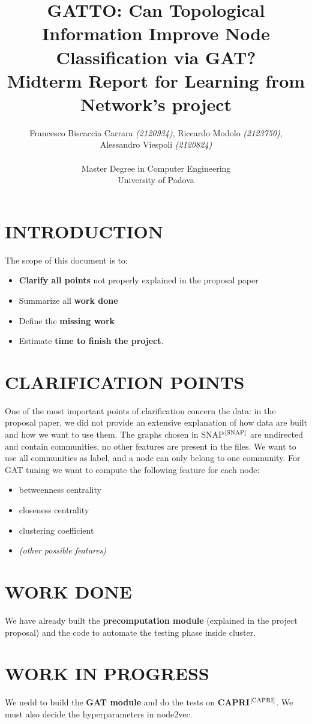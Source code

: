 \documentclass[12pt,conference]{ieeeconf} %
\title{GATTO: Can Topological Information Improve Node Classification via GAT?\\
\large Midterm Report for Learning from Network's project \\}
\author{Francesco Biscaccia Carrara \textit{(2120934)}, Riccardo Modolo \textit{(2123750)},\\ Alessandro Viespoli \textit{(2120824)} %
\\\\ Master Degree in Computer Engineering \\
University of Padova \\
}
\begin{document}
\maketitle
\thispagestyle{plain}
\pagestyle{plain}

\section{INTRODUCTION} 
The scope of this document is to:
\begin{itemize}
    \item \textbf{Clarify all points} not properly explained in the proposal paper
    \item Summarize all \textbf{work done}
    \item Define the \textbf{missing work} 
    \item Estimate \textbf{time to finish the project}.
\end{itemize}

\section{CLARIFICATION POINTS}
One of the most important points of clarification concern the data: in the proposal paper, we did not provide an extensive explanation of how data are built and how we want to use them.
The graphs chosen in SNAP$^\text{\cite{SNAP}}$ are undirected and contain communities, no other features are present in the files. 
We want to use all communities as label, and a node can only belong to one community.
For GAT tuning we want to compute the following feature for each node:
\begin{itemize}
    \item betweenness centrality
    \item closeness centrality
    \item clustering coefficient
    \item \textit{(other possible features)}
\end{itemize}


\section{WORK DONE}
We have already built the \textbf{precomputation module} (explained in the project proposal) 
and the code to automate the testing phase inside cluster.

\section{WORK IN PROGRESS}
We nedd to build the \textbf{GAT module} and do the tests on \textbf{CAPRI}$^\text{\cite{CAPRI}}$. 
We must also decide the hyperparameters in node2vec.
\end{document}
